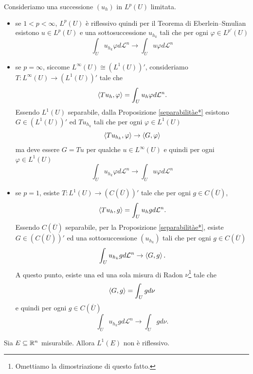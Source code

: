 \begin{osservazione}\label{convergenzadeboleLp}
Consideriamo una successione $(u_h)$ in $L^p(U)$ limitata.
\begin{itemize}
	\item se $1 < p < \infty$, $L^p(U)$ è riflessivo quindi per il Teorema di Eberlein--Smulian esistono $u \in L^p(U)$ e una sottosuccessione $u_{h_{k}}$ tali che per ogni $\varphi \in L^{p'}(U)$
	\[ \int_{U}u_{h_{k}}\varphi d\mathcal{L}^n \to \int_{U}u\varphi d\mathcal{L}^n \]
	\item se $p = \infty$, siccome $L^\infty(U) \cong (L^1(U))'$, consideriamo $T: L^\infty(U) \to (L^1(U))'$ tale che 
	\[ \braket{Tu_h,\varphi} = \int_{U}u_h\varphi d\mathcal{L}^n. \]
	Essendo $L^1(U)$ separabile, dalla Proposizione \eqref{separabilitàe*} esistono  $G \in (L^1(U))'$ ed $Tu_{h_{k}}$ tali che per ogni $\varphi \in L^{1}(U)$
	\[ \braket{Tu_{h_{k}},\varphi} \to \braket{G,\varphi}\]
	ma deve essere $G = Tu$ per qualche $u \in L^\infty(U)$ e quindi  per ogni $\varphi \in L^{1}(U)$
	\[ \int_{U}u_{h_{k}}\varphi d\mathcal{L}^n \to \int_{U}u\varphi d\mathcal{L}^n \]
	\item se $p=1$, esiste $T: L^1(U) \to \left( C(\overline{U})\right)'$ tale che per ogni $g \in C(\overline{U})$,
	\[ \braket{Tu_h,g} = \int_U u_h g d\mathcal{L}^n. \]
	Essendo $C(\overline{U})$ separabile, per la Proposizione \eqref{separabilitàe*}, esiste $G \in \left( C(\overline{U})\right)'$ ed una sottosuccessione $(u_{h_k})$ tali che per ogni $g \in C(\overline{U})$ 
	\[ \int_U u_{h_k} g d\mathcal{L}^n \to \braket{G,g}. \]
	A questo punto, esiste una ed una sola misura di Radon $\nu$\footnote{Omettiamo la dimostriazione di questo fatto.} tale che
	\[ \braket{G,g} = \int_U gd\nu \]
	e quindi per ogni $g \in C(\overline{U})$
	\[ \int_U u_{h_k} g d\mathcal{L}^n \to \int_U gd\nu.\]
\end{itemize}
\end{osservazione}
\begin{proposizione}
	Sia $E \subseteq \mathbb{R}^{n} $ misurabile. Allora $L^{1}(E)$ non è riflessivo.
\end{proposizione}
